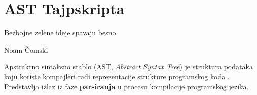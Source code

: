 \chapter{AST Tajpskripta}

\epigraph{
  Bezbojne zelene ideje spavaju besno.\footnotemark
}{Noam Čomski}


Apstraktno sintaksno stablo (AST, \textsl{Abstract Syntax Tree}) je struktura podataka koju koriste kompajleri radi reprezentacije strukture programskog koda \cite{wiki:ast}.
Predstavlja izlaz iz faze \textbf{parsiranja} u procesu kompilacije programskog jezika.




